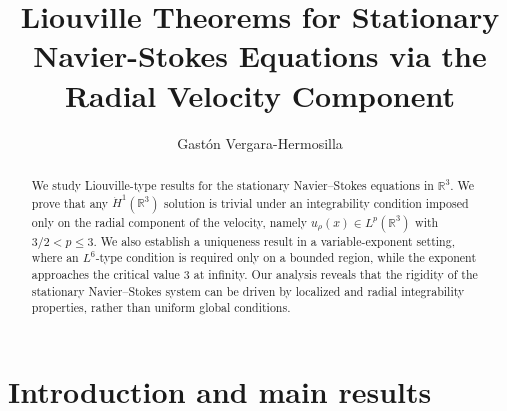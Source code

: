 \documentclass[a4paper,12pt]{amsart}
\theoremstyle{definition}
\theoremstyle{plain}
\begin{document}
	
	
	\title[Liouville Theorems for SNS via the Radial Velocity Component]{Liouville Theorems for Stationary Navier-Stokes Equations via the Radial Velocity Component}

	
	\author{Gast\'{o}n Vergara-Hermosilla}
\address{Institute for Theoretical Sciences, Westlake University, 310030 Hangzhou, Zhejiang, People's
Republic of China}
	
	\maketitle
	
	
\begin{abstract}
We study Liouville-type results for the stationary Navier--Stokes equations in $\mathbb{R}^3$. We prove that any $\dot{H}^1(\mathbb{R}^3)$ solution is trivial under an integrability condition imposed only on the radial component of the velocity, namely $u_\rho(x) \in L^p(\mathbb{R}^3)$ with $3/2 < p \leq 3$. We also establish a uniqueness result in a variable-exponent setting, where an $L^6$-type condition is required only on a bounded region, while the exponent approaches the critical value $3$ at infinity. Our analysis reveals that the rigidity of the stationary Navier--Stokes system can be driven by localized and  radial  integrability properties, rather than uniform global conditions.
\end{abstract}

 \section{Introduction and main results}
 
\end{document}
